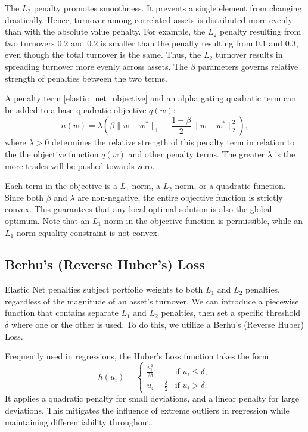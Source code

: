 \documentclass[11pt, letterpaper]{article}
\begin{document}
The ${L_2}$ penalty promotes smoothness. It prevents a single element from changing drastically. Hence, turnover among
correlated assets is distributed more evenly than with the absolute value penalty. For example, the $L_2$ penalty resulting from
two turnovers $0.2$ and $0.2$ is smaller than the penalty resulting from $0.1$ and $0.3$, even though the total turnover is the
same. Thus, the $L_2$ turnover results in spreading turnover more evenly across assets. The $\beta$ parameters governs relative
strength of penalties between the two terms.

A penalty term \eqref{elastic_net_objective} and an alpha gating quadratic term can be added to a base quadratic objective
$q(w)$:
\begin{equation*}
	n(w) = \lambda \left(\beta \lVert w-w^*\rVert_1 + \frac{1 - \beta}{2} \lVert w-w^*\rVert_2^2\right),
\end{equation*}
where $\lambda > 0$ determines the relative strength of this penalty term in relation to the the objective function $q(w)$ and
other penalty terms. The greater $\lambda$ is the more trades will be pushed towards zero.

Each term in the objective is a $L_1$ norm, a $L_2$ norm, or a quadratic function. Since both $\beta$ and $\lambda$ are
non-negative, the entire objective function is strictly convex. This guarantees that any local optimal solution is also the
global optimum. Note that an $L_1$ norm in the objective function is permissible, while an $L_1$ norm equality constraint is not
convex.

\subsection{Berhu's (Reverse Huber's) Loss}
Elastic Net penalties subject portfolio weights to both $L_1$ and $L_2$ penalties, regardless of the magnitude of an asset's turnover.
We can introduce a piecewise function that contains separate $L_1$ and $L_2$ penalties, then set a specific threshold $\delta$ where one
or the other is used. To do this, we utilize a Berhu's (Reverse Huber) Loss.

Frequently used in regressions, the Huber's Loss function takes the form
\begin{equation}
\label{huber_loss}
    h(u_i) = \begin{cases}
        \frac{u_i^2}{2\delta} & \text{if } u_i \leq \delta, \\
        u_i - \frac{\delta}{2} & \text{if } u_i > \delta.
    \end{cases}
\end{equation}
It applies a quadratic penalty for small deviations, and a linear penalty for large deviations. This mitigates the influence of
extreme outliers in regression while maintaining differentiability throughout.
\end{document}
